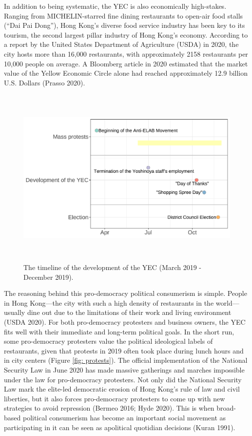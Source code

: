\documentclass[letterpaper, 12pt]{article}
\begin{document}
In addition to being systematic, the YEC is also economically high-stakes. Ranging from MICHELIN-starred fine dining restaurants to open-air food stalls (``Dai Pai Dong''), Hong Kong's diverse food service industry has been key to its tourism, the second largest pillar industry of Hong Kong's economy. According to a report by the United States Department of Agriculture (USDA) in 2020, the city hosts more than 16,000 restaurants, with approximately 2158 restaurants per 10,000 people on average. A Bloomberg article in 2020 estimated that the market value of the Yellow Economic Circle alone had reached approximately 12.9 billion U.S. Dollars (Prasso 2020). 


\vspace{9pt}
\begin{figure}[h!]
\begin{center}
        \includegraphics[width=15cm, height=9cm]{Visuals/timeline_yec.pdf} 
        \caption{The timeline of the development of the YEC (March 2019 - December 2019).}
        \label{fig: timeline}
\end{center}
\end{figure}


The reasoning behind this pro-democracy political consumerism is simple. People in Hong Kong---the city with such a high density of restaurants in the world---usually dine out due to the limitations of their work and living environment (USDA 2020). For both pro-democracy protesters and business owners, the YEC fits well with their immediate and long-term political goals. In the short run, some pro-democracy protesters value the political ideological labels of restaurants, given that protests in 2019 often took place during lunch hours and in city centers (Figure \ref{fig: protests}). The official implementation of the National Security Law in June 2020 has made massive gatherings and marches impossible under the law for pro-democracy protesters. Not only did the National Security Law mark the elite-led democratic erosion of Hong Kong's rule of law and civil liberties, but it also forces pro-democracy protesters to come up with new strategies to avoid repression (Bermeo 2016; Hyde 2020). This is when broad-based political consumerism has become an important social movement as participating in it can be seen as apolitical quotidian decisions (Kuran 1991). 
\end{document}
